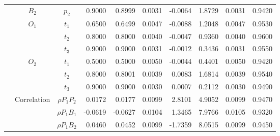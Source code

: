 \documentclass[letterpaper]{article}
\begin{document}
\begin{table}[h]
\begin{tabular}{cccrrrrrrr}
            & $B_2$       & $p_2$          & 0.9000                 & 0.8999                 & 0.0031                 & -0.0064                & 1.8729                 & 0.0031                   & 0.9420                 \\
            & $O_1$       & $t_1$          & 0.6500                 & 0.6499                 & 0.0047                 & -0.0088                & 1.2048                 & 0.0047                   & 0.9530                 \\
            &             & $t_2$          & 0.8000                 & 0.8000                 & 0.0040                 & -0.0047                & 0.9360                 & 0.0040                   & 0.9600                 \\
            &             & $t_3$          & 0.9000                 & 0.9000                 & 0.0031                 & -0.0012                & 0.3436                 & 0.0031                   & 0.9550                 \\
            & $O_2$       & $t_1$          & 0.5000                 & 0.5000                 & 0.0050                 & -0.0044                & 0.4401                 & 0.0050                   & 0.9420                 \\
            &             & $t_2$          & 0.8000                 & 0.8001                 & 0.0039                 & 0.0083                 & 1.6814                 & 0.0039                   & 0.9540                 \\
            &             & $t_3$          & 0.9000                 & 0.9000                 & 0.0030                 & 0.0007                 & 0.2112                 & 0.0030                   & 0.9490                 \\
            & Correlation & $\rho{P_1P_2}$ & 0.0172                 & 0.0177                 & 0.0099                 & 2.8101                 & 4.9052                 & 0.0099                   & 0.9470                 \\
            &             & $\rho{P_1B_1}$ & -0.0619                & -0.0627                & 0.0104                 & 1.3465                 & 7.9766                 & 0.0105                   & 0.9320                 \\
            &             & $\rho{P_1B_2}$ & 0.0460                 & 0.0452                 & 0.0099                 & -1.7359                & 8.0515                 & 0.0099                   & 0.9450                 \\

\end{tabular}
\end{table}
\end{document}
